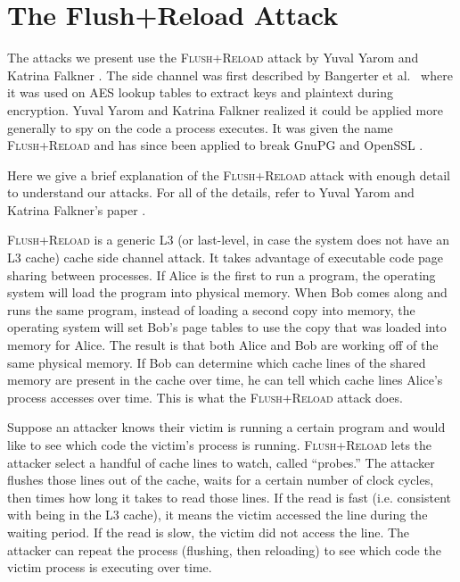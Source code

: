 \documentclass[letterpaper,twocolumn,10pt]{article}
\begin{document}
\section{The Flush+Reload Attack}

The attacks we present use the \textsc{Flush+Reload} attack by Yuval Yarom and
Katrina Falkner \cite{yarom2013flush}. The side channel was first described by
Bangerter et al.\ \cite{gullasch2011cache} where it was used on AES lookup
tables to extract keys and plaintext during encryption. Yuval Yarom and Katrina
Falkner realized it could be applied more generally to spy on the code a process
executes. It was given the name \textsc{Flush+Reload} and has since been applied
to break GnuPG \cite{yarom2013flush} and OpenSSL \cite{benger2014ooh,
yarom2014recovering}.

Here we give a brief explanation of the \textsc{Flush+Reload} attack with enough detail
to understand our attacks. For all of the details, refer to Yuval Yarom and
Katrina Falkner's paper \cite{yarom2013flush}.

\textsc{Flush+Reload} is a generic L3 (or last-level, in case the system does
not have an L3 cache) cache side channel attack. It takes advantage of
executable code page sharing between processes. If Alice is the first to run
a program, the operating system will load the program into physical memory. When
Bob comes along and runs the same program, instead of loading a second copy into
memory, the operating system will set Bob's page tables to use the copy that was
loaded into memory for Alice. The result is that both Alice and Bob are working
off of the same physical memory. If Bob can determine which cache lines of the
shared memory are present in the cache over time, he can tell which cache lines
Alice's process accesses over time. This is what the \textsc{Flush+Reload}
attack does.

Suppose an attacker knows their victim is running a certain program and would
like to see which code the victim's process is running. \textsc{Flush+Reload}
lets the attacker select a handful of cache lines to watch, called ``probes.''
The attacker flushes those lines out of the cache, waits for a certain number of
clock cycles, then times how long it takes to read those lines. If the read is
fast (i.e. consistent with being in the L3 cache), it means the victim accessed
the line during the waiting period. If the read is slow, the victim did not
access the line. The attacker can repeat the process (flushing, then reloading)
to see which code the victim process is executing over time.
\end{document}

